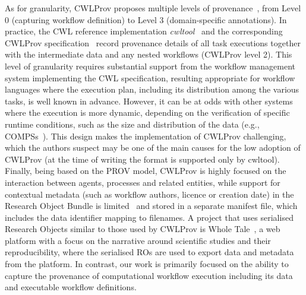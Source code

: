 As for granularity, CWLProv proposes multiple levels of provenance~\cite[Figure 2]{Khan 2019}, from Level 0 (capturing workflow definition) to Level 3 (domain-specific annotations).
In practice, the CWL reference implementation \emph{cwltool}~\cite{Amstutz 2023} and the corresponding CWLProv specification~\cite{Soiland-Reyes 2018} record provenance details of all task executions together with the intermediate data and any nested workflows (CWLProv level 2). This level of granularity requires substantial support from the workflow management system implementing the CWL specification, resulting appropriate for workflow languages where the execution plan, including its distribution among the various tasks, is well known in advance.
However, it can be at odds with other systems where the execution is more dynamic, depending on the verification of specific runtime conditions, such as the size and distribution of the data (e.g., COMPSs~\cite{Lordan 2014}).
This design makes the implementation of CWLProv challenging, which the authors suspect may be one of the main causes for the low adoption of CWLProv (at the time of writing the format is supported only by cwltool).
Finally, being based on the PROV model, CWLProv is highly focused on the interaction between agents, processes and related entities, while support for contextual metadata (such as workflow authors, licence or creation date) in the Research Object Bundle is limited~\cite{rob-context} and stored in a separate manifest file, which includes the data identifier mapping to filenames.
A project that uses serialised Research Objects similar to those used by CWLProv is Whole Tale~\cite{Chard 2019}, a web platform with a focus on the narrative around scientific studies and their reproducibility, where the serialised ROs are used to export data and metadata from the platform. In contrast, our work is primarily focused on the ability to capture the provenance of computational workflow execution including its data and executable workflow definitions.

